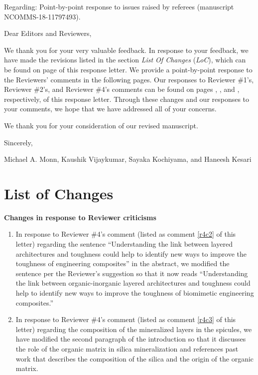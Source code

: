 \documentclass[11pt,letterpaper]{report}
\begin{document}
Regarding: Point-by-point response to issues raised by referees  (manuscript NCOMMS-18-11797493).

\vspace{3em}
Dear Editors and Reviewers,
\vspace{1em}

We thank you for your very valuable feedback. In response to your feedback, we have made the revisions listed in the section \textit{List Of Changes} (\textit{LoC}), which can be found on  page \pageref{LoCpage} of this response letter. We  provide a point-by-point response to the Reviewers' comments in the following pages. Our responses to Reviewer \#1's, Reviewer \#2's, and Reviewer \#4's comments can be found on pages \pageref{rev1}, \pageref{rev2}, and \pageref{rev4}, respectively, of this response letter. Through these changes and our responses to your comments, we hope that we have addressed all of your concerns.

We thank you for your consideration of our revised manuscript.

\vspace{2em}
Sincerely,

Michael A. Monn, Kaushik Vijaykumar, Sayaka Kochiyama, and Haneesh Kesari


\clearpage
\pagestyle{plain}
\section*{List of Changes}
\label{LoCpage}

{\bf Changes in response to Reviewer criticisms}
\begin{enumerate}[label=\textit{Mc.\arabic*}]
%
\item \label{Mc01} In response to Reviewer \#4's comment (listed as comment \ref{r4c2} of this letter) regarding the sentence ``Understanding the link between layered architectures and toughness could
help to identify new ways to improve the toughness of engineering composites'' in the abstract, we modified the sentence per the Reviewer's suggestion so that it now reads ``Understanding the link between organic-inorganic layered architectures and toughness
could help to identify new ways to improve the toughness of biomimetic engineering composites.''
%
\item \label{Mc02} In response to Reviewer \#4's comment (listed as comment \ref{r4c3} of this letter) regarding the composition of the mineralized layers in the spicules, we have modified the second paragraph of the introduction so that it discusses the role of the organic matrix in silica mineralization and references past work that describes the composition of the silica and the origin of the organic matrix.
\end{enumerate}
\end{document}
